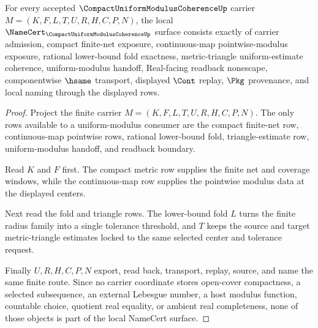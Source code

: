 \begin{theorem}
\label{thm:compact-uniform-modulus-coherence-namecert-obligations}
For every accepted $\CompactUniformModulusCoherenceUp$ carrier $M=(K,F,L,T,U,R,H,C,P,N)$, the local $\NameCert_{\CompactUniformModulusCoherenceUp}$ surface consists exactly of carrier admission, compact finite-net exposure, continuous-map pointwise-modulus exposure, rational lower-bound fold exactness, metric-triangle uniform-estimate coherence, uniform-modulus handoff, Real-facing readback nonescape, componentwise $\hsame$ transport, displayed $\Cont$ replay, $\Pkg$ provenance, and local naming through the displayed rows.
\end{theorem}
\begin{proof}
Project the finite carrier $M=(K,F,L,T,U,R,H,C,P,N)$. The only rows available to a uniform-modulus consumer are the compact finite-net row, continuous-map pointwise rows, rational lower-bound fold, triangle-estimate row, uniform-modulus handoff, and readback boundary.

Read $K$ and $F$ first. The compact metric row supplies the finite net and coverage windows, while the continuous-map row supplies the pointwise modulus data at the displayed centers.

Next read the fold and triangle rows. The lower-bound fold $L$ turns the finite radius family into a single tolerance threshold, and $T$ keeps the source and target metric-triangle estimates locked to the same selected center and tolerance request.

Finally $U,R,H,C,P,N$ export, read back, transport, replay, source, and name the same finite route. Since no carrier coordinate stores open-cover compactness, a selected subsequence, an external Lebesgue number, a host modulus function, countable choice, quotient real equality, or ambient real completeness, none of those objects is part of the local NameCert surface.
\end{proof}

